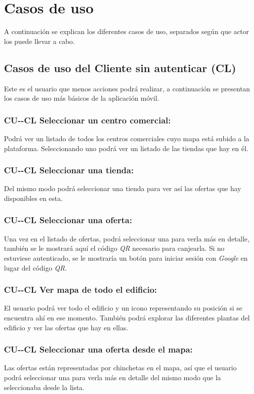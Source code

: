 \section{Casos de uso}
A continuación se explican los diferentes casos de uso, separados según que actor los puede llevar a cabo.
\subsection*{Casos de uso del Cliente sin autenticar (CL)}
Este es el usuario que menos acciones podrá realizar, a continuación se presentan los casos de uso más básicos de la aplicación móvil.
\subsubsection*{CU-\theUseCase-CL Seleccionar un centro comercial:}
Podrá ver un listado de todos los centros comerciales cuyo mapa está subido a la plataforma. Seleccionando uno podrá ver un listado de las tiendas que hay en él.
\subsubsection*{CU-\theUseCase-CL Seleccionar una tienda:}
Del mismo modo podrá seleccionar una tienda para ver así las ofertas que hay disponibles en esta.
\subsubsection*{CU-\theUseCase-CL Seleccionar una oferta:}
Una vez en el listado de ofertas, podrá seleccionar una para verla más en detalle, también se le mostrará aquí el código \textit{QR} necesario para canjearla. Si no estuviese autenticado, se le mostraría un botón para iniciar sesión con \textit{Google} en lugar del código \textit{QR}.
\subsubsection*{CU-\theUseCase-CL Ver mapa de todo el edificio:}
El usuario podrá ver todo el edificio y un icono representando su posición si se encuentra ahí en ese momento. También podrá explorar las diferentes plantas del edificio y ver las ofertas que hay en ellas.
\subsubsection*{CU-\theUseCase-CL Seleccionar una oferta desde el mapa:}
Las ofertas están representadas por chinchetas en el mapa, así que el usuario podrá seleccionar una para verla más en detalle del mismo modo que la seleccionaba desde la lista.
